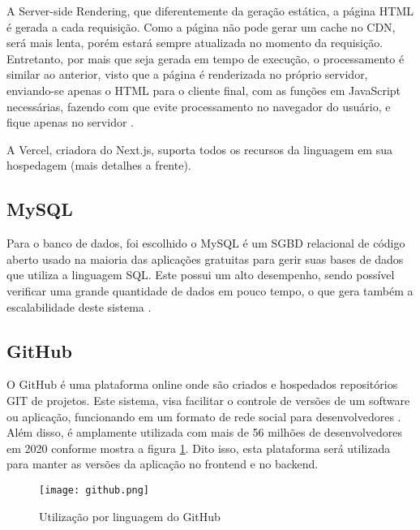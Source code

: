 A Server-side Rendering, que diferentemente da geração estática, a página HTML é gerada a cada requisição. Como a página não pode gerar um cache no CDN, será mais lenta, porém estará sempre atualizada no momento da requisição. Entretanto, por mais que seja gerada em tempo de execução, o processamento é similar ao anterior, visto que a página é renderizada no próprio servidor, enviando-se apenas o HTML para o cliente final, com as funções em JavaScript necessárias, fazendo com que evite processamento no navegador do usuário, e fique apenas no servidor \cite{VERCEL}.

A Vercel, criadora do Next.js, suporta todos os recursos da linguagem em sua hospedagem (mais detalhes a frente).

\subsection{MySQL}
Para o banco de dados, foi escolhido o MySQL é um SGBD relacional de código aberto usado na maioria das aplicações gratuitas para gerir suas bases de dados que utiliza a linguagem SQL. Este possui um alto desempenho, sendo possível verificar uma grande quantidade de dados em pouco tempo, o que gera também a escalabilidade deste sistema \cite{HEUSER}.

\subsection{GitHub}
O GitHub é uma plataforma online onde são criados e hospedados repositórios GIT de projetos. Este sistema, visa facilitar o controle de versões de um software ou aplicação, funcionando em um formato de rede social para desenvolvedores \cite{SANTACROCE}. Além disso, é amplamente utilizada com mais de 56 milhões de desenvolvedores em 2020 conforme mostra a figura \ref{utilizacao_github}. Dito isso, esta plataforma será utilizada para manter as versões da aplicação no frontend e no backend.

\begin{figure}[H]
    \caption{\label{utilizacao_github}Utilização por linguagem do GitHub}
    \vspace{5pt}
    \centering
    \texttt{[image: github.png]}
    \vspace{5pt}
\end{figure}

